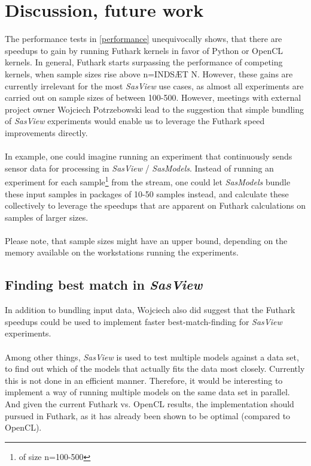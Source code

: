 \documentclass[11pt]{article}
\newcommand{\sasmodels}{\textit{SasModels}}
\newcommand{\sasview}{\textit{SasView}}
\begin{document}
\section{Discussion, future work}
\label{sec:discussion}
The performance tests in \ref{performance} unequivocally shows, that
there are speedups to gain by running Futhark kernels in favor of Python or
OpenCL kernels.
In general, Futhark starts surpassing the performance of competing kernels, when
sample sizes rise above n=INDSÆT N. However, these gains are currently
irrelevant for the most \sasview{} use cases, as almost all
experiments are carried out on sample sizes of between 100-500.
However, meetings with external project owner Wojciech Potrzebowski lead to the
suggestion that simple bundling of \sasview{} experiments would enable us
to leverage the Futhark speed improvements directly.
\\\\
In example, one could imagine running an experiment that continuously sends
sensor data for processing in \sasview{} / \sasmodels.
Instead of running an experiment for each sample\footnote{of size n=100-500}
from the stream, one could let \sasmodels{} bundle these input samples in packages
of 10-50 samples
instead, and calculate these collectively to leverage the speedups that are
apparent on Futhark calculations on samples of larger sizes.
\\\\
Please note, that sample sizes might have an upper bound, depending on the
memory available on the workstations running the experiments.

\subsection{Finding best match in \sasview}
\label{sec:best-match}
In addition to bundling input data, Wojciech also did suggest that the Futhark
speedups could be used to implement faster best-match-finding for \sasview
experiments.
\\\\
Among other things, \sasview{} is used to test multiple models against a data set,
to find out which of the models that actually fits the data most closely.
Currently this is not done in an efficient manner.
Therefore, it would be interesting to implement a way of running multiple models
on the same data set in parallel.
And given the current Futhark vs. OpenCL results, the implementation should
pursued in Futhark, as it has already been shown to be optimal
(compared to OpenCL).
\end{document}
